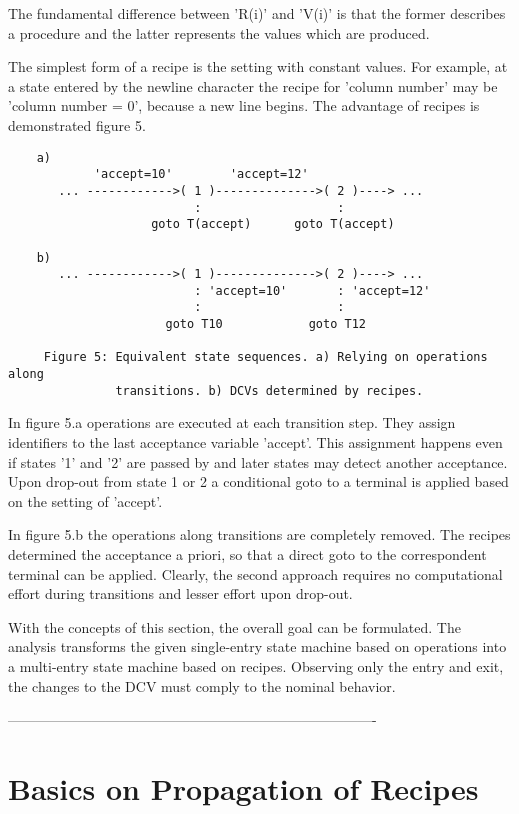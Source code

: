 \documentclass[12pt]{article}
\begin{document}
The fundamental difference between 'R(i)' and 'V(i)' is that the former describes
a procedure and the latter represents the values which are produced.

The simplest form of a recipe is the setting with constant values.  For
example, at a state entered by the newline character the recipe for 'column
number' may be 'column number = 0', because a new line begins. The advantage of
recipes is demonstrated figure 5.


\begin{verbatim}
    a)        
            'accept=10'        'accept=12'        
       ... ------------>( 1 )-------------->( 2 )----> ...
                          :                   :
                    goto T(accept)      goto T(accept)

    b) 
       ... ------------>( 1 )-------------->( 2 )----> ...
                          : 'accept=10'       : 'accept=12'              
                          :                   :
                      goto T10            goto T12

     Figure 5: Equivalent state sequences. a) Relying on operations along
               transitions. b) DCVs determined by recipes.
\end{verbatim}

In figure 5.a operations are executed at each transition step. They assign
identifiers to the last acceptance variable 'accept'. This assignment happens
even if states '1' and '2' are passed by and later states may detect another
acceptance. Upon drop-out from state 1 or 2 a conditional goto to a terminal is
applied based on the setting of 'accept'. 

In figure 5.b the operations along transitions are completely removed. The
recipes determined the acceptance a priori, so that a direct goto to the
correspondent terminal can be applied.  Clearly, the second approach requires
no computational effort during transitions and lesser effort upon drop-out.

With the concepts of this section, the overall goal can be formulated. The
analysis transforms the given single-entry state machine based on operations
into a multi-entry state machine based on recipes. Observing only the entry and
exit, the changes to the DCV must comply to the nominal behavior. 

-------------------------------------------------------------------------------

\section{Basics on Propagation of Recipes}
\end{document}
